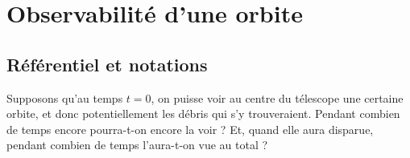 \renewcommand{\phi}{\varphi}

\newcommand{\TD}{T_\text{d}}
\newcommand{\omegaD}{\omega_\text{d}}
\newcommand{\iD}{i_\text{d}}
\newcommand{\altitudeD}{r}
\newcommand{\rayonD}{\rayonT+\altitudeD}

\newcommand{\TT}{T_\text{t}}
\newcommand{\omegaT}{\omega_\text{t}}
\newcommand{\iT}{i_\text{t}}
\newcommand{\rayonT}{R}

\newcommand{\referentiel}{\mathcal{R}}

\section{Observabilité d'une orbite}

\subsection{Référentiel et notations}

Supposons qu'au temps $t=0$, on puisse voir au centre du télescope une certaine orbite, et donc potentiellement les débris qui s'y trouveraient. Pendant combien de temps encore pourra-t-on encore la voir ? Et, quand elle aura disparue, pendant combien de temps l'aura-t-on vue au total ?

